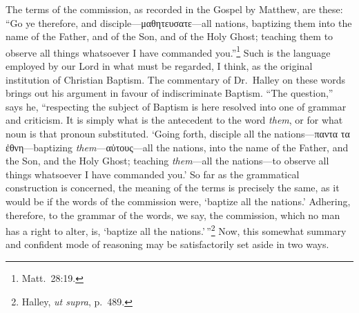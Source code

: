\documentclass[
  english,
]{book}
\newcommand{\textgreek}[2][]{\foreignlanguage{greek}{#2}}
\begin{document}
The terms of the commission, as recorded in the Gospel by Matthew, are these: ``Go ye therefore, and disciple---\textgreek{μαθητευσατε}---all nations, baptizing them into the name of the Father, and of the Son, and of the Holy Ghost; teaching them to observe all things whatsoever I have commanded you.''\footnote{Matt.~28:19.} Such is the language employed by our Lord in what must be regarded, I think, as the original institution of Christian Baptism. The commentary of Dr.~Halley on these words brings out his argument in favour of indiscriminate Baptism. ``The question,'' says he, ``respecting the subject of Baptism is here resolved into one of grammar and criticism. It is simply what is the antecedent to the word \emph{them}, or for what noun is that pronoun substituted. `Going forth, disciple all the nations---\textgreek{παντα τα ἐθνη}---baptizing \emph{them}---\textgreek{αὐτους}---all the nations, into the name of the Father, and the Son, and the Holy Ghost; teaching \emph{them}---all the nations---to observe all things whatsoever I have commanded you.' So far as the grammatical construction is concerned, the meaning of the terms is precisely the same, as it would be if the words of the commission were, `baptize all the nations.' Adhering, therefore, to the grammar of the words, we say, the commission, which no man has a right to alter, is, `baptize all the nations.'\,''\footnote{Halley, \emph{ut supra}, p.~489.} Now, this somewhat summary and confident mode of reasoning may be satisfactorily set aside in two ways.
\end{document}
